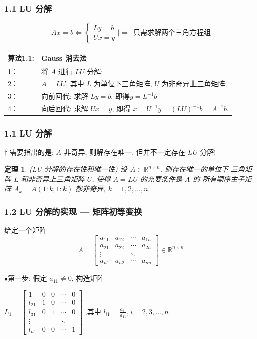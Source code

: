 \documentclass[notheorems,serif]{beamer}
\newcommand{\hei}[1]{{\HEI#1}}
\newtheorem{theorem}{\hei{定理}}
\begin{document}
\begin{frame}
\frametitle{1.1 \quad LU 分解}
\begin{equation}
A x=b \Longleftrightarrow\left\{\begin{array}{l}{L y=b} \\ {U x=y}\end{array} | \Longrightarrow \text{ 只需求解两个三角方程组} \right.
\end{equation}

\begin{table}  
	\begin{tabular*}{16cm}{ll}  
		\hline  
		算法1.1: & Gauss 消去法 \\  
		\hline  
		1：   &将 $A$ 进行 $LU$ 分解:\\  
		2：   &$A = LU$, 其中 $L$ 为单位下三角矩阵, $U$ 为非奇异上三角矩阵;\\
		3：   &向前回代: 求解 $Ly = b$, 即得$ y = L^{-1}b$\\
		4：   &向后回代: 求解 $Ux = y$, 即得 $x = U^{-1}y = (LU)^{-1}b = A^{-1}b$.\\  
		\hline  
	\end{tabular*}  
\end{table} 
\end{frame}

\begin{frame}
\frametitle{1.1 \quad LU 分解}
$†$ 需要指出的是: $A$ 非奇异, 则解存在唯一, 但并不一定存在 $LU$ 分解!
\begin{theorem}(LU 分解的存在性和唯一性)
	设 $A ∈ \mathbb{R}^{n×n}$. 则存在唯一的单位下
	三角矩阵 $L$ 和非奇异上三角矩阵 $U$, 使得 $A = LU$ 的充要条件是 $A$ 的
	所有顺序主子矩阵 $A_k = A(1:k, 1:k)$ 都非奇异, $k = 1, 2, . . . , n.$	
\end{theorem}
\end{frame}

\begin{frame}
\frametitle{1.2 \quad LU 分解的实现 — 矩阵初等变换}
给定一个矩阵
\begin{equation*}
A=\left[\begin{array}{cccc}{a_{11}} & {a_{12}} & {\cdots} & {a_{1 n}} \\ {a_{21}} & {a_{22}} & {\cdots} & {a_{2 n}} \\ {\vdots} & {} & {\ddots} & {} \\ {a_{n 1}} & {a_{n 2}} & {\cdots} & {a_{n n}}\end{array}\right] \in \mathbb{R}^{n \times n}
\end{equation*}

$\bullet$第一步: 假定 $a_{11} \neq  0$, 构造矩阵

{$L_{1}=\left[\begin{array}{ccccc}{1} & {0} & {0} & {\cdots} & {0} \\ {l_{21}} & {1} & {0} & {\cdots} & {0} \\ {l_{31}} & {0} & {1} & {\cdots} & {0} \\ {\vdots} & {} & {} & {\ddots} \\ {l_{n 1}} & {0} & {0} & {\cdots} & {1}\end{array}\right]$ $\text{,其中}$ $l_{i 1}=\frac{a_{i 1}}{a_{11}}, i=2,3, \dots, n $}
\end{frame}
\end{document}
